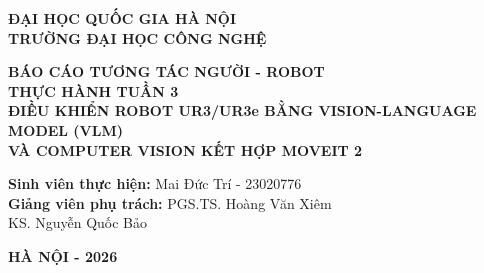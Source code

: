 \documentclass[a4paper,12pt]{article}
\begin{document}
\begin{titlepage}
    \centering
    \vspace*{0.5cm}
    {\Large \textbf{ĐẠI HỌC QUỐC GIA HÀ NỘI}}\\[0.2cm]
    {\Large \textbf{TRƯỜNG ĐẠI HỌC CÔNG NGHỆ}}\\[1.5cm]

    \begin{figure}[H]
        \centering
    \end{figure}
    \vspace{1.0cm}

    {\large \textbf{BÁO CÁO TƯƠNG TÁC NGƯỜI - ROBOT}}\\[1.5cm]

    {\LARGE \textbf{THỰC HÀNH TUẦN 3}}\\[0.4cm]
    {\Large \textbf{ĐIỀU KHIỂN ROBOT UR3/UR3e BẰNG VISION-LANGUAGE MODEL (VLM)\\VÀ COMPUTER VISION KẾT HỢP MOVEIT 2}}\\[2.5cm]

    \begin{flushleft}
        \large
        \hspace*{1.5cm}\textbf{Sinh viên thực hiện:} Mai Đức Trí - 23020776\\[0.3cm]
        \hspace*{1.5cm}\textbf{Giảng viên phụ trách:} PGS.TS. Hoàng Văn Xiêm\\
        \hspace*{4.8cm}KS. Nguyễn Quốc Bảo
    \end{flushleft}

    \vfill
    {\large \textbf{HÀ NỘI - 2026}}
\end{titlepage}
\end{document}
